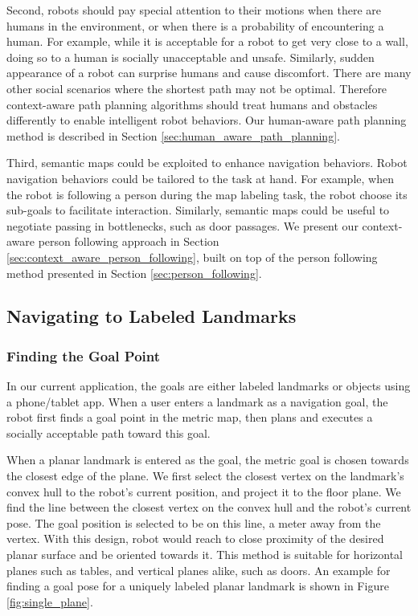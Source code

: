 \documentclass{tADR2e}
\begin{document}
Second, robots should pay special attention to their motions when there are humans in the environment, or when there is a probability of encountering a human. For example, while it is acceptable for a robot to get very close to a wall, doing so to a human is socially unacceptable and unsafe. Similarly, sudden appearance of a robot can surprise humans and cause discomfort. There are many other social scenarios where the shortest path may not be optimal. Therefore context-aware path planning algorithms should treat humans and obstacles differently to enable intelligent robot behaviors. Our human-aware path planning method is described in Section \ref{sec:human_aware_path_planning}.

Third, semantic maps could be exploited to enhance navigation behaviors. Robot navigation behaviors could be tailored to the task at hand. For example, when the robot is following a person during the map labeling task, the robot choose its sub-goals to facilitate interaction. Similarly, semantic maps could be useful to negotiate passing in bottlenecks, such as door passages. We present our context-aware person following approach in Section \ref{sec:context_aware_person_following}, built on top of the person following method presented in Section \ref{sec:person_following}.

\subsection{Navigating to Labeled Landmarks}
\label{sec:navigating_to_labeled_landmarks}

\subsubsection{Finding the Goal Point}
\label{sec:finding_the_goal_point}

In our current application, the goals are either labeled landmarks or objects using a phone/tablet app. When a user enters a landmark as a navigation goal, the robot first finds a goal point in the metric map, then plans and executes a socially acceptable path toward this goal.

When a planar landmark is entered as the goal, the metric goal is chosen towards the closest edge of the plane. We first select the closest vertex on the landmark's convex hull to the robot's current position, and project it to the floor plane. We find the line between the closest vertex on the convex hull and the robot's current pose. The goal position is selected to be on this line, a meter away from the vertex. With this design, robot would reach to close proximity of the desired planar surface and be oriented towards it. This method is suitable for horizontal planes such as tables, and vertical planes alike, such as doors. An example for finding a goal pose for a uniquely labeled planar landmark is shown in Figure \ref{fig:single_plane}.
\end{document}
